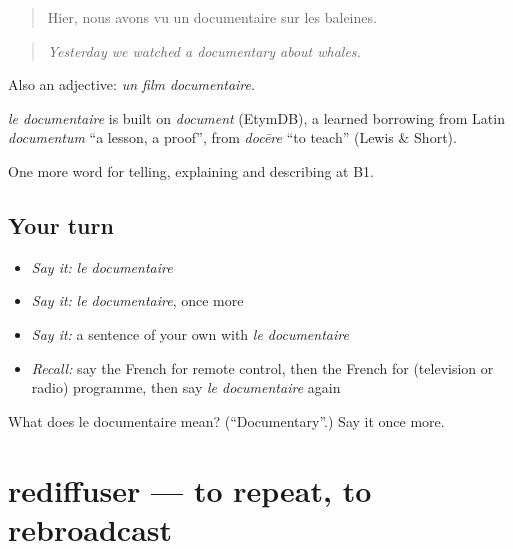 \begin{quote}
Hier, nous avons vu un documentaire sur les baleines.
\end{quote}

\begin{quote}
\emph{Yesterday we watched a documentary about whales.}
\end{quote}

Also an adjective: \emph{un film documentaire}.

\begin{cousinweb}
\emph{le documentaire} is built on \emph{document} (EtymDB), a learned borrowing from Latin \emph{documentum} \textquotedblleft{}a lesson, a proof\textquotedblright{}, from \emph{docēre} \textquotedblleft{}to teach\textquotedblright{} (Lewis \& Short).
\end{cousinweb}

\begin{grammarlens}[title={What you've built}]
One more word for telling, explaining and describing at B1.
\end{grammarlens}

\subsection*{Your turn}
\begin{itemize}
\raggedright
  \item \emph{Say it:} \emph{le documentaire}
  \item \emph{Say it:} \emph{le documentaire}, once more
  \item \emph{Say it:} a sentence of your own with \emph{le documentaire}
  \item \emph{Recall:} say the French for remote control, then the French for (television or radio) programme, then say \emph{le documentaire} again
\end{itemize}

\begin{tcolorbox}[breakable,colback=teal!4,colframe=teal!35!black,title={Before you move on}]
What does le documentaire mean? (\textquotedblleft{}Documentary\textquotedblright{}.) Say it once more.
\end{tcolorbox}
\section[rediffuser]{rediffuser — to repeat, to rebroadcast}

\label{lesson:FR-C525-rediffuser}



